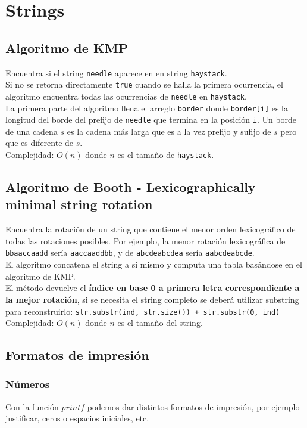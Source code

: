 \documentclass[10pt,letterpaper,twocolumn]{article}
\newcommand{\source}[1]{
	
	\dotfill
}
\begin{document}
\section{Strings}
	\subsection{Algoritmo de KMP}
		Encuentra si el string \verb|needle| aparece en en string \verb|haystack|.\\
		Si no se retorna directamente \verb|true| cuando se halla la primera ocurrencia, el algoritmo encuentra todas las ocurrencias de \verb|needle| en \verb|haystack|.\\
		La primera parte del algoritmo llena el arreglo \verb|border| donde \verb|border[i]| es la longitud del borde del prefijo de \verb|needle| que termina en la posición \verb|i|. Un borde de una cadena $s$ es la cadena más larga que es a la vez prefijo y sufijo de $s$ pero que es diferente de $s$.\\
		Complejidad: $O(n)$ donde $n$ es el tamaño de \verb|haystack|.\\
		\source{./src/kmp.cpp}

	\subsection{Algoritmo de Booth - Lexicographically minimal string rotation}
		Encuentra la rotación de un string que contiene el menor orden lexicográfico de todas las rotaciones posibles. Por ejemplo, la menor rotación lexicográfica de \texttt{bbaaccaadd} sería \texttt{aaccaaddbb}, y de \texttt{abcdeabcdea} sería \texttt{aabcdeabcde}. \\
		El algoritmo concatena el string a sí mismo y computa una tabla basándose en el algoritmo de KMP.\\
		El método devuelve el \textbf{índice en base 0 a primera letra correspondiente a la mejor rotación}, si se necesita el string completo se deberá utilizar substring para reconstruirlo: \texttt{str.substr(ind, str.size()) + str.substr(0, ind)}\\		
Complejidad: $O(n)$ donde $n$ es el tamaño del string.
		\source{./src/booths.cpp}

	\subsection{Formatos de impresión}
		\subsubsection{Números}
		Con la función $printf$ podemos dar distintos formatos de impresión, por ejemplo justificar, ceros o espacios iniciales, etc.
			\source{./src/printFormat.cpp}
\end{document}
